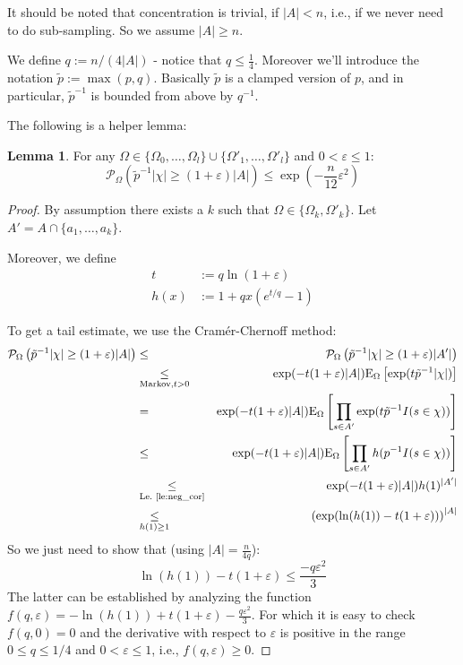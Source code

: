 \documentclass{article}
\newcommand{\prob}{\mathcal P}
\newcommand{\expectation}{\mathrm{E}}
\newcommand{\eps}{\varepsilon}
\theoremstyle{definition}
\newtheorem{lemma}{Lemma}
\begin{document}
It should be noted that concentration is trivial, if $|A| < n$, i.e., if we never need to do sub-sampling.
So we assume $|A| \geq n$.

We define $q := n/(4|A|)$ - notice that $q \leq \frac{1}{4}$. Moreover we'll introduce the notation $\tilde{p} := \max(p,q)$.
Basically $\tilde{p}$ is a clamped version of $p$, and in particular, $\tilde{p}^{-1}$ is bounded from above by $q^{-1}$.

The following is a helper lemma:
\begin{lemma}
\label{le:helper}
For any $\Omega \in \{\Omega_0,\ldots,\Omega_l\} \cup \{\Omega'_1,\ldots,\Omega'_l\}$ and $0 < \eps \leq 1$:
\[
\prob_{\Omega} \left( \tilde{p}^{-1} |\chi| \geq (1+\eps) |A| \right) \leq \exp\left(-\frac{n}{12} \eps^2\right)
\]
\end{lemma}
\begin{proof}
By assumption there exists a $k$ such that $\Omega \in \{\Omega_k, \Omega'_k\}$. Let $A' = A \cap \{a_1,\ldots,a_k\}$.

Moreover, we define
\begin{align*}
  t & := q \ln( 1 + \eps) \\
  h(x) & := 1+qx(e^{t/q}-1)  
\end{align*}

To get a tail estimate, we use the Cram\'{e}r-Chernoff method:
{\allowdisplaybreaks
\begin{eqnarray*}
  \prob_{\Omega} \left( \tilde{p}^{-1} |\chi| \geq (1+\eps) |A| \right) & \leq & \prob_{\Omega} \left( \tilde{p}^{-1} |\chi| \geq (1+\eps) |A'| \right) \\
  & \underset{\textrm{Markov,}t>0}{\leq} & \exp( -t (1+\eps) |A| ) \expectation_\Omega \left[ \exp ( t \tilde{p}^{-1} |\chi| ) \right] \\
 & = & \exp( -t (1+\eps) |A| ) \expectation_\Omega \left[ \prod_{s \in A'} \exp ( t \tilde{p}^{-1} I(s \in \chi) ) \right] \\
 & \leq & \exp( -t (1+\eps) |A| ) \expectation_\Omega \left[ \prod_{s \in A'} h( p^{-1} I(s \in \chi) ) \right] \\
 & \underset{\textrm{Le.~\ref{le:neg_cor}}}{\leq} & \exp( -t (1+\eps) |A| ) h(1)^{|A'|} \\
 & \underset{h(1)\geq 1}{\leq} & \left(\exp( \ln(h(1)) -t (1+\eps))\right) ^ {|A|} 
\end{eqnarray*}}
So we just need to show that (using $|A|=\frac{n}{4q}$):
\[
  \ln(h(1))-t (1+\eps) \leq \frac{-q \eps^2}{3}
\]
The latter can be established by analyzing the function $f(q,\eps) = -\ln (h(1)) +t (1+\eps) - \frac{q\eps^2}{3}$.
For which it is easy to check $f(q,0) = 0$ and the derivative with respect to $\eps$ is positive in the range $0 \leq q \leq 1/4$ and $0 < \eps \leq 1$, i.e.,
$f(q,\eps) \geq 0$.
\end{proof}
\end{document}
